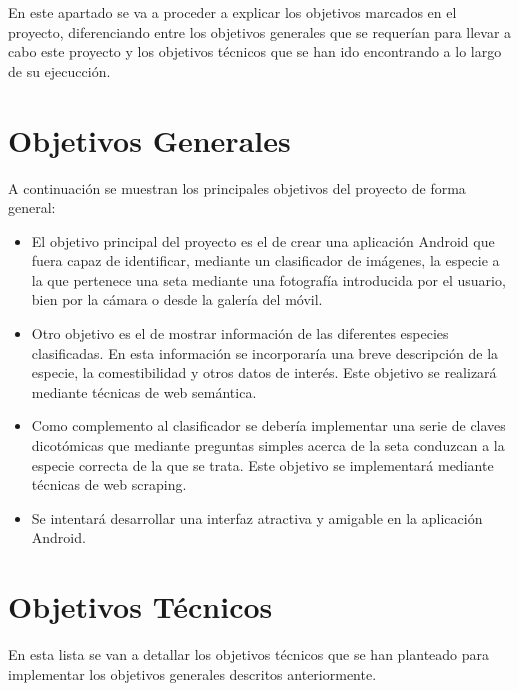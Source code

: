 
En este apartado se va a proceder a explicar los objetivos marcados en el proyecto, diferenciando entre los objetivos generales que se requerían para llevar a cabo este proyecto y los objetivos técnicos que se han ido encontrando a lo largo de su ejecucción.

\section{Objetivos Generales}

A continuación se muestran los principales objetivos del proyecto de forma general:

\begin{itemize}
	\item El objetivo principal del proyecto es el de crear una aplicación Android que fuera capaz de identificar, mediante un clasificador de imágenes, la especie a la que pertenece una seta mediante una fotografía introducida por el usuario, bien por la cámara o desde la galería del móvil.
	\item Otro objetivo es el de mostrar información de las diferentes especies clasificadas. En esta información se incorporaría una breve descripción de la especie, la comestibilidad y otros datos de interés. Este objetivo se realizará mediante técnicas de web semántica.
	\item Como complemento al clasificador se debería implementar una serie de claves dicotómicas que mediante preguntas simples acerca de la seta conduzcan a la especie correcta de la que se trata. Este objetivo se implementará mediante técnicas de web scraping.
	\item Se intentará desarrollar una interfaz atractiva y amigable en la aplicación Android.
\end{itemize}

\section{Objetivos Técnicos}

En esta lista se van a detallar los objetivos técnicos que se han planteado para implementar los objetivos generales descritos anteriormente.

